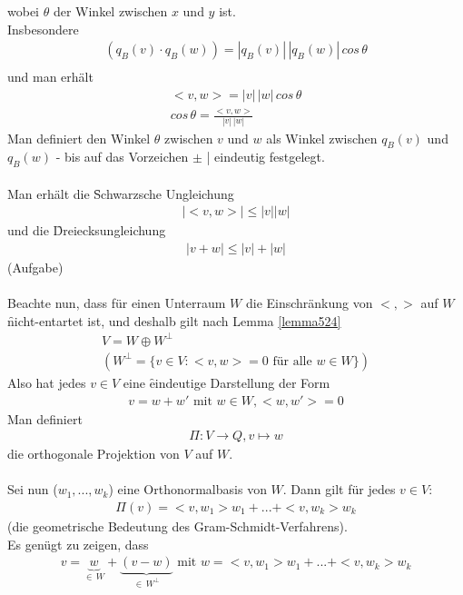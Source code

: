 wobei $\theta$ der Winkel zwischen $x$ und $y$ ist.\\
Insbesondere
\begin{align}
(q_B(v)\cdot q_B(w)) = |q_B(v)|\,|q_B(w)| \,cos\, \theta \\
\end{align}
und man erhält
\begin{align}
<v, w> = |v|\,|w|\,cos\, \theta\\
cos\,\theta = \frac{<v,w>}{|v|\,|w|}
\end{align}
Man definiert den Winkel $\theta$ zwischen $v$ und $w$ als Winkel zwischen $q_B(v)$ und $q_B(w)$ - bis auf das Vorzeichen $\pm$ | eindeutig festgelegt.\\\\
Man erhält die \f{Schwarzsche Ungleichung}
\begin{align}
|<v, w>| \leq |v||w|
\end{align}
und die \f{Dreiecksungleichung}
\begin{align}
|v+w| \leq |v| + |w|
\end{align}
(Aufgabe)\\\\
Beachte nun, dass für einen Unterraum $W$ die Einschränkung von $<, >$ auf $W$ \f{nicht-entartet} ist, und deshalb gilt nach Lemma \ref{lemma524}
\begin{align}
V = W \oplus W^{\perp}\\
(W^{\perp} = \{v \in V: <v, w> = 0 \text{ für alle } w \in W \})
\end{align}
Also hat jedes $v \in V$ eine \f{eindeutige} Darstellung der Form
\begin{align}
v = w + w' \text{ mit } w \in W, <w, w'> = 0
\end{align}
Man definiert
\begin{align}
\Pi: V \rightarrow Q, v \mapsto w
\end{align}
die orthogonale Projektion von $V$ auf $W$.\\\\
Sei nun ($w_1, ..., w_k$) eine Orthonormalbasis von $W$. Dann gilt für jedes $v \in V$:
\begin{align}
\Pi(v) = <v, w_1> w_1 + ... + <v, w_k> w_k
\end{align}
(die geometrische Bedeutung des Gram-Schmidt-Verfahrens).\\
Es genügt zu zeigen, dass
\begin{align}
v = \underbrace{w}_{\in\, W} + \underbrace{(v-w)}_{\in\, W^{\perp}} \text{ mit } w = <v, w_1>w_1 + ... + <v, w_k>w_k
\end{align}
